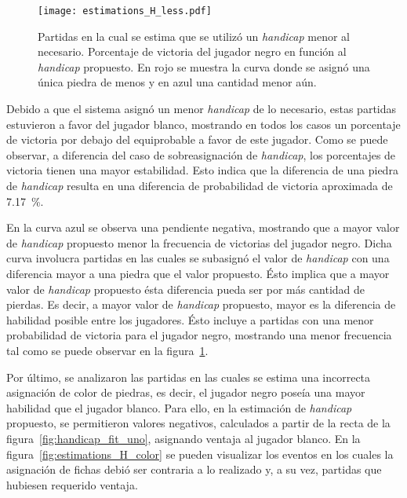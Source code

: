 \documentclass[11pt,twoside,spanish]{report} %
\begin{document}
\begin{figure}[H]
    \centering
    \texttt{[image: estimations\_H\_less.pdf]}
    \caption{Partidas en la cual se estima que se utiliz\'o un \textit{handicap} menor al necesario. Porcentaje de victoria del jugador negro en funci\'on al \textit{handicap} propuesto.  En rojo se muestra la curva donde se asign\'o  una \'unica piedra de menos  y en azul una cantidad menor a\'un.}
    \label{fig:handicap_porcentaje_de_menos}
\end{figure}



Debido a que el sistema asign\'o un menor \textit{handicap} de lo necesario, estas partidas estuvieron a favor del jugador blanco, mostrando en todos los casos un porcentaje de victoria por debajo del equiprobable a favor de este jugador.
Como se puede observar, a diferencia del caso de sobreasignaci\'on de \textit{handicap}, los porcentajes de victoria tienen una mayor estabilidad.
Esto indica que la diferencia de una piedra de \textit{handicap} resulta en una diferencia de probabilidad de victoria aproximada de \SI{7.17}{\percent}.

En la curva azul se observa una pendiente negativa, mostrando que a mayor valor de \textit{handicap} propuesto menor la frecuencia de victorias del jugador negro.
Dicha curva involucra partidas en las cuales se subasign\'o el valor de \textit{handicap} con una diferencia mayor a una piedra que el valor propuesto.
\'Esto implica que a mayor valor de \textit{handicap} propuesto \'esta diferencia pueda ser por m\'as cantidad de pierdas.
Es decir, a mayor valor de \textit{handicap} propuesto,  mayor es la diferencia de habilidad posible entre los jugadores.
\'Esto incluye a partidas con una menor probabilidad de victoria para el jugador negro, mostrando una menor frecuencia tal como se puede observar en la figura~\ref{fig:handicap_porcentaje_de_menos}.


Por \'ultimo, se analizaron las partidas en las cuales se estima una incorrecta asignaci\'on de color de piedras, es decir, el jugador negro pose\'ia una mayor habilidad que el jugador blanco.
Para ello, en la estimaci\'on de \textit{handicap} propuesto, se permitieron valores negativos, calculados a partir de la recta de la figura~\ref{fig:handicap_fit_uno}, asignando ventaja al jugador blanco.
En la figura~\ref{fig:estimations_H_color} se pueden visualizar los eventos en los cuales la asignaci\'on de fichas debi\'o ser contraria a lo realizado y, a su vez, partidas que hubiesen requerido ventaja.
\end{document}
